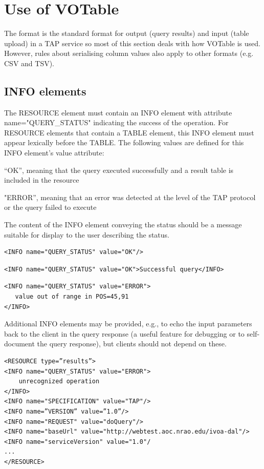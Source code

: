 \documentclass[11pt,letter]{ivoa}
\begin{document}
\section{Use of VOTable}
\label{sec:votable}

The \citep{std:VOTable} format is the standard format for output (query 
results) and input (table upload) in a TAP service so most of this section 
deals with how VOTable is used. However, rules about serialising column values 
also apply to other formats (e.g. CSV and TSV).

\subsection{INFO elements}
\label{sec:vot-info}

The RESOURCE element must contain an INFO element with attribute 
name="QUERY\_STATUS" indicating the success of the operation. For 
RESOURCE elements that contain a TABLE element, this INFO element must appear 
lexically before the TABLE. The following values are defined for this INFO 
element's value attribute:

“OK”, meaning that the query executed successfully and a result table is 
included in the resource 

"ERROR”, meaning that an error was detected at the level of the TAP 
protocol or the query failed to execute 

The content of the INFO element conveying the status should be a message 
suitable for display to the user describing the status.

\begin{verbatim}
<INFO name="QUERY_STATUS" value="OK"/>
\end{verbatim}
 
\begin{verbatim}
<INFO name="QUERY_STATUS" value="OK">Successful query</INFO>
\end{verbatim}

\begin{verbatim}
<INFO name="QUERY_STATUS" value="ERROR">
   value out of range in POS=45,91
</INFO>
\end{verbatim}

Additional INFO elements may be provided, e.g., to echo the input parameters 
back to the client in the query response (a useful feature for debugging or to 
self-document the query response), but clients should not depend on these. 

\begin{verbatim}
<RESOURCE type=”results”>
<INFO name="QUERY_STATUS" value="ERROR">
    unrecognized operation
</INFO>
<INFO name="SPECIFICATION" value="TAP"/>
<INFO name=”VERSION” value=”1.0”/>
<INFO name="REQUEST" value="doQuery"/>
<INFO name="baseUrl" value="http://webtest.aoc.nrao.edu/ivoa-dal"/>
<INFO name="serviceVersion" value="1.0"/
...
</RESOURCE>
\end{verbatim}
\end{document}
